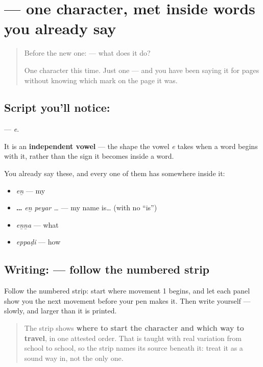 \section[\texorpdfstring{\ta{எ} (e)}{எ (e)}]{ — one character, met inside words you already say}

\label{lesson:TA-S112-letter-e}



\begin{quote}
Before the new one:  — what does it do?

One character this time. Just one — and you have been saying it for pages without knowing which mark on the page it was.
\end{quote}

\subsection*{Script you'll notice: }
\textbf{} — \emph{e}.

It is an \textbf{independent vowel} — the shape the vowel \emph{e} takes when a word begins with it, rather than the sign it becomes inside a word.

You already say these, and every one of them has  somewhere inside it:

\begin{itemize}
\raggedright
  \item \textbf{} \emph{eṉ} — my
  \item \textbf{  …} \emph{eṉ peyar …} — my name is… (with no \textquotedblleft{}is\textquotedblright{})
  \item \textbf{} \emph{eṉṉa} — what
  \item \textbf{} \emph{eppaḍi} — how
\end{itemize}

\subsection*{Writing:  — follow the numbered strip}

Follow the numbered strip: start where movement 1 begins, and let each panel show you the next movement before your pen makes it. Then write  yourself — slowly, and larger than it is printed.

\begin{quote}
The strip shows \textbf{where to start the character and which way to travel}, in one attested order. That is taught with real variation from school to school, so the strip names its source beneath it: treat it as a sound way in, not the only one.
\end{quote}


